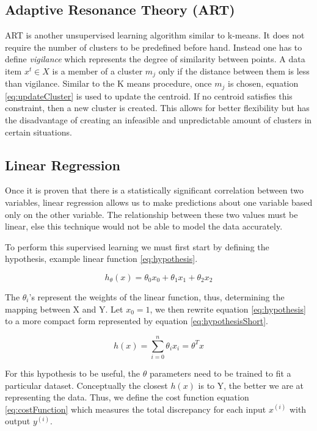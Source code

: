 \documentclass{mproj}
\begin{document}
\subsection{Adaptive Resonance Theory (ART)}
\label{sec:artExplanation}
ART \cite{art} is another unsupervised learning algorithm similar to k-means. It does not require the number of clusters to be predefined before hand. Instead one has to define \textit{vigilance} which represents the degree of similarity between points. A data item $x^t \in X$ is a member of a cluster $m_j$ only if the distance between them is less than vigilance. Similar to the K means procedure, once $m_j$ is chosen, equation \ref{eq:updateCluster} is used to update the centroid. If no centroid satisfies this constraint, then a new cluster is created. This allows for better flexibility but has the disadvantage of creating an infeasible and unpredictable amount of clusters in certain situations.

\subsection{Linear Regression}
\label{linearregression}
Once it is proven that there is a statistically significant correlation between two variables, linear regression allows us to make predictions about one variable based only on the other variable. The relationship between these two values must be linear, else this technique would not be able to model the data accurately.

To perform this supervised learning we must first start by defining the hypothesis, example linear function \ref{eq:hypothesis}.

\begin{equation}
\label{eq:hypothesis}
h_\theta(x) = \theta_0x_0 + \theta_1x_1 + \theta_2x_2
\end{equation}

The $\theta_i$'s represent the weights of the linear function, thus, determining the mapping between X and Y. Let $x_0=1$, we then rewrite equation \ref{eq:hypothesis} to a more compact form represented by equation \ref{eq:hypothesisShort}.

\begin{equation}
\label{eq:hypothesisShort}
h(x) = \sum_{i=0}^{n} \theta_ix_i = \theta^Tx
\end{equation}

For this hypothesis to be useful, the $\theta$ parameters need to be trained to fit a particular dataset. Conceptually the closest $h(x)$ is to Y, the better we are at representing the data. Thus, we define the cost function equation \ref{eq:costFunction} which measures the total discrepancy for each input $x^{(i)}$ with output $y^{(i)}$.
\end{document}
